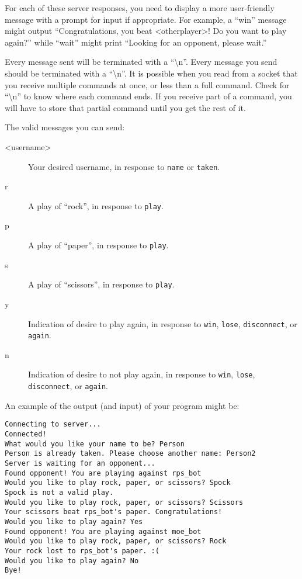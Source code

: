 \documentclass[11pt]{cselabheader}
\begin{document}
\begin{description}
  For each of these server responses, you need to display a more user-friendly
  message
  with a prompt for input if appropriate. For example, a ``win'' message might
  output ``Congratulations, you beat <otherplayer>! Do you want to play again?''
  while ``wait'' might print ``Looking for an opponent, please wait.''

  Every message sent will be terminated with a ``\textbackslash{}n''. Every message you send
  should be terminated with a ``\textbackslash{}n''. It is possible when you read from a socket
  that you receive multiple commands at once, or less than a full command. Check
  for ``\textbackslash{}n'' to know where each command ends. If you receive part of a command, you
  will have to store that partial command until you get the rest of it.

  The valid messages you can send:

  \begin{description}
  \item[<username>] Your desired username, in response to \lstinline{name} or
    \lstinline{taken}.
  \item[r] A play of ``rock'', in response to \lstinline{play}.
  \item[p] A play of ``paper'', in response to \lstinline{play}.
  \item[s] A play of ``scissors'', in response to \lstinline{play}.
  \item[y] Indication of desire to play again, in response to \lstinline{win},
    \lstinline{lose}, \lstinline{disconnect}, or \lstinline{again}.
  \item[n] Indication of desire to not play again, in response to \lstinline{win},
    \lstinline{lose}, \lstinline{disconnect}, or \lstinline{again}.
  \end{description}

  An example of the output (and input) of your program might be:

  \begin{lstlisting}[style=bash]
Connecting to server...
Connected!
What would you like your name to be? Person
Person is already taken. Please choose another name: Person2
Server is waiting for an opponent...
Found opponent! You are playing against rps_bot
Would you like to play rock, paper, or scissors? Spock
Spock is not a valid play.
Would you like to play rock, paper, or scissors? Scissors
Your scissors beat rps_bot's paper. Congratulations!
Would you like to play again? Yes
Found opponent! You are playing against moe_bot
Would you like to play rock, paper, or scissors? Rock
Your rock lost to rps_bot's paper. :(
Would you like to play again? No
Bye!
  \end{lstlisting}


\end{description}
\end{document}

